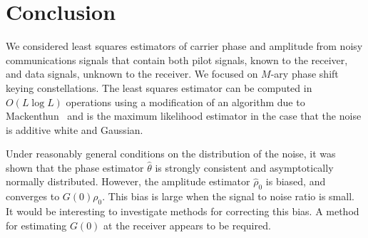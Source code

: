 \documentclass[journal]{IEEEtran}
\begin{document}




\section{Conclusion}

We considered least squares estimators of carrier phase and amplitude from noisy communications signals that contain both pilot signals, known to the receiver, and data signals, unknown to the receiver.  We focused on $M$-ary phase shift keying constellations.  The least squares estimator can be computed in $O(L\log L)$ operations using a modification of an algorithm due to Mackenthun~\cite{Mackenthun1994} and is the maximum likelihood estimator in the case that the noise is additive white and Gaussian.  

Under reasonably general conditions on the distribution of the noise, it was shown that the phase estimator $\hat{\theta}$ is strongly consistent and asymptotically normally distributed.  However, the amplitude estimator $\hat{\rho}_0$ is biased, and converges to $G(0)\rho_0$.  This bias is large when the signal to noise ratio is small.  It would be interesting to investigate methods for correcting this bias.  A method for estimating $G(0)$ at the receiver appears to be required.  
\end{document}
